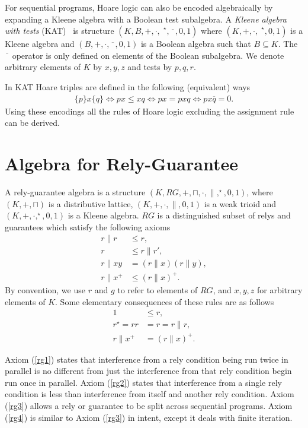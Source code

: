 \documentclass{llncs}
\begin{document}
For sequential programs, Hoare logic can also be encoded algebraically by
expanding a Kleene algebra with a Boolean test subalgebra. A
\emph{Kleene algebra with tests} (KAT)~\cite{kozen_kleene_1997} is structure
$(K,B,+,\cdot,\phantom{|}^\star,\overline{\phantom{x}},0,1)$ where
$(K,+,\cdot,\phantom{|}^\star,0,1)$ is a Kleene algebra and
$(B,+,\cdot,\overline{\phantom{x}},0,1)$ is a Boolean algebra such
that $B \subseteq K$. The $\overline{\phantom{x}}$ operator is only
defined on elements of the Boolean subalgebra. We denote arbitrary
elements of $K$ by $x,y,z$ and tests by $p,q,r$.

In KAT Hoare triples are defined in the following (equivalent) ways
\begin{align*}
\{p\}x\{q\} \iff px \le xq \iff px = pxq \iff px\overline{q} = 0.
\end{align*}
Using these encodings all the rules of Hoare logic excluding the
assignment rule can be derived.

\newpage
\section{Algebra for Rely-Guarantee}
\label{sec:RG}

A rely-guarantee algebra is a structure
$(K,RG,+,\sqcap,\cdot,\|,^\star,0,1)$, where $(K,+,\sqcap)$ is a
distributive lattice, $(K,+,\cdot,\|,0,1)$ is a weak trioid and
$(K,+,\cdot,^\star,0,1)$ is a Kleene algebra. $RG$ is a distinguished
subset of relys and guarantees which satisfy the following axioms
\begin{align}
r\|r &\le r, \label{rg1}\\
r &\le r\|r', \label{rg2}\\
r\|xy &= (r\|x)(r\|y), \label{rg3}\\
r\|x^+ &\le (r\|x)^+ \label{rg4}.
\end{align}
By convention, we use $r$ and $g$ to refer to elements of $RG$, and
$x,y,z$ for arbitrary elements of $K$. Some elementary consequences of these rules are as follows
\begin{align*}
1 &\le r,\\
r^\star = rr &= r = r\|r,\\
r\|x^+ &= (r\|x)^+.
\end{align*}


Axiom (\ref{rg1}) states that interference from a rely condition being
run twice in parallel is no different from just the interference from
that rely condition begin run once in parallel. Axiom (\ref{rg2})
states that interference from a single rely condition is less than
interference from itself and another rely condition. Axiom (\ref{rg3})
allows a rely or guarantee to be split across sequential
programs. Axiom (\ref{rg4}) is similar to Axiom (\ref{rg3}) in intent,
except it deals with finite iteration.
\end{document}
